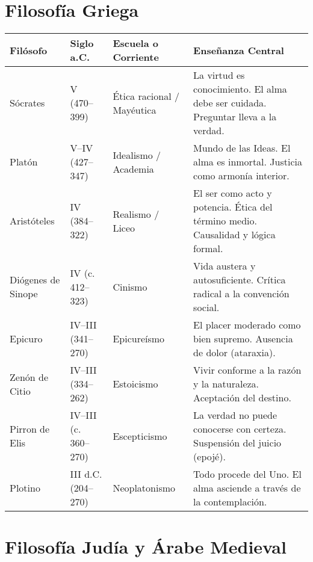 \documentclass[12pt]{article}
\begin{document}
\section*{Filosofía Griega}

\begin{tabularx}{\textwidth}{@{} l l l X @{}}
\toprule
\textbf{Filósofo} & \textbf{Siglo a.C.} & \textbf{Escuela o Corriente} & \textbf{Enseñanza Central} \\
\midrule
Sócrates           & V (470–399)       & Ética racional / Mayéutica   & La virtud es conocimiento. El alma debe ser cuidada. Preguntar lleva a la verdad. \\
Platón             & V–IV (427–347)    & Idealismo / Academia         & Mundo de las Ideas. El alma es inmortal. Justicia como armonía interior. \\
Aristóteles        & IV (384–322)      & Realismo / Liceo             & El ser como acto y potencia. Ética del término medio. Causalidad y lógica formal. \\
Diógenes de Sinope & IV (c. 412–323)   & Cinismo                      & Vida austera y autosuficiente. Crítica radical a la convención social. \\
Epicuro            & IV–III (341–270)  & Epicureísmo                  & El placer moderado como bien supremo. Ausencia de dolor (ataraxia). \\
Zenón de Citio     & IV–III (334–262)  & Estoicismo                   & Vivir conforme a la razón y la naturaleza. Aceptación del destino. \\
Pirron de Elis     & IV–III (c. 360–270) & Escepticismo                & La verdad no puede conocerse con certeza. Suspensión del juicio (epojé). \\
Plotino            & III d.C. (204–270) & Neoplatonismo               & Todo procede del Uno. El alma asciende a través de la contemplación. \\
\bottomrule
\end{tabularx}

\section*{Filosofía Judía y Árabe Medieval}
\end{document}
